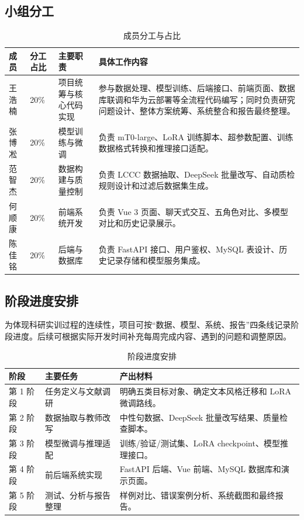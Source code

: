 \documentclass[12pt,a4paper]{ctexart}
\begin{document}
\subsection{小组分工}

\begin{table}[H]
\centering
\caption{成员分工与占比}
\begin{tabular}{p{1.6cm}|p{1.4cm}|p{3cm}|p{6.8cm}}
\toprule
成员 & 分工占比 & 主要职责 & 具体工作内容 \\
\midrule
王浩楠 & 20\% & 项目统筹与核心代码实现 & 参与数据处理、模型训练、后端接口、前端页面、数据库联调和华为云部署等全流程代码编写；同时负责研究问题设计、整体方案统筹、系统整合和报告最终整理。 \\
张博凇 & 20\% & 模型训练与微调 & 负责 mT0-large、LoRA 训练脚本、超参数配置、训练数据格式转换和推理接口适配。 \\
范智杰 & 20\% & 数据构建与质量控制 & 负责 LCCC 数据抽取、DeepSeek 批量改写、自动质检规则设计和过滤后数据集生成。 \\
何顺康 & 20\% & 前端系统开发 & 负责 Vue 3 页面、聊天式交互、五角色对比、多模型对比和历史记录展示。 \\
陈佳铭 & 20\% & 后端与数据库 & 负责 FastAPI 接口、用户鉴权、MySQL 表设计、历史记录存储和模型服务集成。 \\
\bottomrule
\end{tabular}
\end{table}

\subsection{阶段进度安排}

为体现科研实训过程的连续性，项目可按“数据、模型、系统、报告”四条线记录阶段进度。后续可根据实际开发时间补充每周完成内容、遇到的问题和调整原因。

\begin{table}[H]
\centering
\caption{阶段进度安排}
\label{tab:schedule}
\begin{tabular}{p{2.2cm}|p{4.2cm}|p{6.2cm}}
\toprule
阶段 & 主要任务 & 产出材料 \\
\midrule
第 1 阶段 & 任务定义与文献调研 & 明确五类目标对象、确定文本风格迁移和 LoRA 微调路线。 \\
第 2 阶段 & 数据抽取与教师改写 & 中性句数据、DeepSeek 批量改写结果、质量检查脚本。 \\
第 3 阶段 & 模型微调与推理适配 & 训练/验证/测试集、LoRA checkpoint、模型推理接口。 \\
第 4 阶段 & 前后端系统实现 & FastAPI 后端、Vue 前端、MySQL 数据库和演示页面。 \\
第 5 阶段 & 测试、分析与报告整理 & 样例对比、错误案例分析、系统截图和最终报告。 \\
\bottomrule
\end{tabular}
\end{table}
\end{document}
